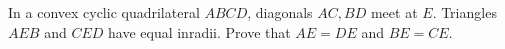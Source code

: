 In a convex cyclic quadrilateral $ABCD$, diagonals $AC,BD$ meet at $E$. Triangles $AEB$ and $CED$ have equal inradii. Prove that $AE=DE$ and $BE=CE$.
